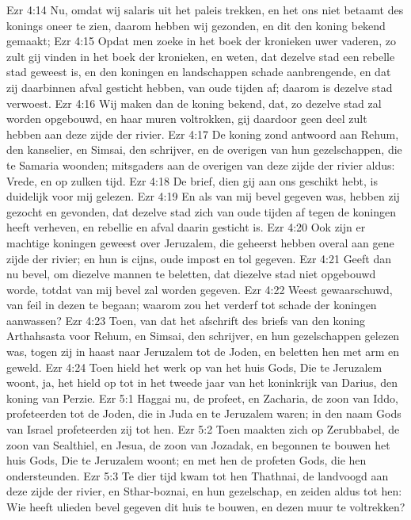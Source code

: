 Ezr 4:14  Nu, omdat wij salaris uit het paleis trekken, en het ons niet betaamt des konings oneer te zien, daarom hebben wij gezonden, en dit den koning bekend gemaakt;
Ezr 4:15  Opdat men zoeke in het boek der kronieken uwer vaderen, zo zult gij vinden in het boek der kronieken, en weten, dat dezelve stad een rebelle stad geweest is, en den koningen en landschappen schade aanbrengende, en dat zij daarbinnen afval gesticht hebben, van oude tijden af; daarom is dezelve stad verwoest.
Ezr 4:16  Wij maken dan de koning bekend, dat, zo dezelve stad zal worden opgebouwd, en haar muren voltrokken, gij daardoor geen deel zult hebben aan deze zijde der rivier.
Ezr 4:17  De koning zond antwoord aan Rehum, den kanselier, en Simsai, den schrijver, en de overigen van hun gezelschappen, die te Samaria woonden; mitsgaders aan de overigen van deze zijde der rivier aldus: Vrede, en op zulken tijd.
Ezr 4:18  De brief, dien gij aan ons geschikt hebt, is duidelijk voor mij gelezen.
Ezr 4:19  En als van mij bevel gegeven was, hebben zij gezocht en gevonden, dat dezelve stad zich van oude tijden af tegen de koningen heeft verheven, en rebellie en afval daarin gesticht is.
Ezr 4:20  Ook zijn er machtige koningen geweest over Jeruzalem, die geheerst hebben overal aan gene zijde der rivier; en hun is cijns, oude impost en tol gegeven.
Ezr 4:21  Geeft dan nu bevel, om diezelve mannen te beletten, dat diezelve stad niet opgebouwd worde, totdat van mij bevel zal worden gegeven.
Ezr 4:22  Weest gewaarschuwd, van feil in dezen te begaan; waarom zou het verderf tot schade der koningen aanwassen?
Ezr 4:23  Toen, van dat het afschrift des briefs van den koning Arthahsasta voor Rehum, en Simsai, den schrijver, en hun gezelschappen gelezen was, togen zij in haast naar Jeruzalem tot de Joden, en beletten hen met arm en geweld.
Ezr 4:24  Toen hield het werk op van het huis Gods, Die te Jeruzalem woont, ja, het hield op tot in het tweede jaar van het koninkrijk van Darius, den koning van Perzie.
Ezr 5:1  Haggai nu, de profeet, en Zacharia, de zoon van Iddo, profeteerden tot de Joden, die in Juda en te Jeruzalem waren; in den naam Gods van Israel profeteerden zij tot hen.
Ezr 5:2  Toen maakten zich op Zerubbabel, de zoon van Sealthiel, en Jesua, de zoon van Jozadak, en begonnen te bouwen het huis Gods, Die te Jeruzalem woont; en met hen de profeten Gods, die hen ondersteunden.
Ezr 5:3  Te dier tijd kwam tot hen Thathnai, de landvoogd aan deze zijde der rivier, en Sthar-boznai, en hun gezelschap, en zeiden aldus tot hen: Wie heeft ulieden bevel gegeven dit huis te bouwen, en dezen muur te voltrekken?
